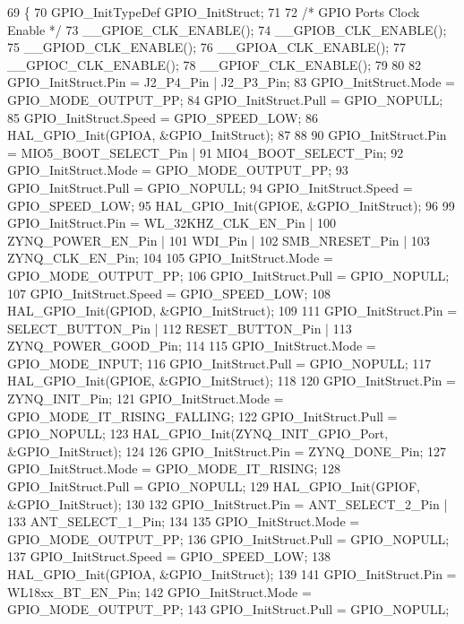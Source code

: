 \begin{DoxyCode}
69 \{
70     GPIO\_InitTypeDef GPIO\_InitStruct;
71 
72     \textcolor{comment}{/* GPIO Ports Clock Enable */}
73     \_\_GPIOE\_CLK\_ENABLE();
74     \_\_GPIOB\_CLK\_ENABLE();
75     \_\_GPIOD\_CLK\_ENABLE();
76     \_\_GPIOA\_CLK\_ENABLE();
77     \_\_GPIOC\_CLK\_ENABLE();
78     \_\_GPIOF\_CLK\_ENABLE();
79     
80     
82     GPIO\_InitStruct.Pin = J2\_P4\_Pin | J2\_P3\_Pin;
83     GPIO\_InitStruct.Mode = GPIO\_MODE\_OUTPUT\_PP;
84     GPIO\_InitStruct.Pull = GPIO\_NOPULL;
85     GPIO\_InitStruct.Speed = GPIO\_SPEED\_LOW;
86     HAL\_GPIO\_Init(GPIOA, &GPIO\_InitStruct);
87     
88 
90     GPIO\_InitStruct.Pin = MIO5\_BOOT\_SELECT\_Pin | 
91                   MIO4\_BOOT\_SELECT\_Pin;
92     GPIO\_InitStruct.Mode = GPIO\_MODE\_OUTPUT\_PP;
93     GPIO\_InitStruct.Pull = GPIO\_NOPULL;
94     GPIO\_InitStruct.Speed = GPIO\_SPEED\_LOW;
95     HAL\_GPIO\_Init(GPIOE, &GPIO\_InitStruct);
96 
99     GPIO\_InitStruct.Pin = WL\_32KHZ\_CLK\_EN\_Pin | 
100                   ZYNQ\_POWER\_EN\_Pin |
101                   WDI\_Pin |
102                   SMB\_NRESET\_Pin |
103                   ZYNQ\_CLK\_EN\_Pin;
104                 
105     GPIO\_InitStruct.Mode = GPIO\_MODE\_OUTPUT\_PP;
106     GPIO\_InitStruct.Pull = GPIO\_NOPULL;
107     GPIO\_InitStruct.Speed = GPIO\_SPEED\_LOW;
108     HAL\_GPIO\_Init(GPIOD, &GPIO\_InitStruct);
109 
111     GPIO\_InitStruct.Pin = SELECT\_BUTTON\_Pin |
112                   RESET\_BUTTON\_Pin |
113                   ZYNQ\_POWER\_GOOD\_Pin;
114                 
115     GPIO\_InitStruct.Mode = GPIO\_MODE\_INPUT;
116     GPIO\_InitStruct.Pull = GPIO\_NOPULL;
117     HAL\_GPIO\_Init(GPIOE, &GPIO\_InitStruct);
118     
120     GPIO\_InitStruct.Pin = ZYNQ\_INIT\_Pin;
121     GPIO\_InitStruct.Mode = GPIO\_MODE\_IT\_RISING\_FALLING;
122     GPIO\_InitStruct.Pull = GPIO\_NOPULL;
123     HAL\_GPIO\_Init(ZYNQ\_INIT\_GPIO\_Port, &GPIO\_InitStruct);
124     
126     GPIO\_InitStruct.Pin = ZYNQ\_DONE\_Pin;
127     GPIO\_InitStruct.Mode = GPIO\_MODE\_IT\_RISING;
128     GPIO\_InitStruct.Pull = GPIO\_NOPULL;
129     HAL\_GPIO\_Init(GPIOF, &GPIO\_InitStruct);
130 
132     GPIO\_InitStruct.Pin = ANT\_SELECT\_2\_Pin |
133                   ANT\_SELECT\_1\_Pin;
134     
135     GPIO\_InitStruct.Mode = GPIO\_MODE\_OUTPUT\_PP;
136     GPIO\_InitStruct.Pull = GPIO\_NOPULL;
137     GPIO\_InitStruct.Speed = GPIO\_SPEED\_LOW;
138     HAL\_GPIO\_Init(GPIOA, &GPIO\_InitStruct);
139 
141     GPIO\_InitStruct.Pin = WL18xx\_BT\_EN\_Pin;
142     GPIO\_InitStruct.Mode = GPIO\_MODE\_OUTPUT\_PP;
143     GPIO\_InitStruct.Pull = GPIO\_NOPULL;

\end{DoxyCode}
